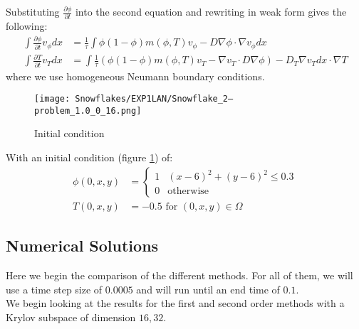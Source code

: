 Substituting $\frac{\partial \phi}{\partial t}$ into the second equation and rewriting in weak form gives the following:
\begin{align*}
    \int \frac{\partial \phi}{\partial t} v_{\phi}dx &=  \frac 1{\tau}\int \phi(1-\phi)m(\phi,T)v_{\phi} - D \nabla \phi \cdot \nabla v_{\phi}dx\\
    \int \frac{\partial T}{\partial t} v_T dx &= \int \frac 1{\tau}(\phi(1-\phi)m(\phi,T)v_T - \nabla v_T \cdot D \nabla \phi) - D_T \nabla v_Tdx \cdot \nabla T
\end{align*}
where we use homogeneous Neumann boundary conditions.
\begin{figure}[H]
    \centering
    \texttt{[image: Snowflakes/EXP1LAN/Snowflake\_2--problem\_1.0\_0\_16.png]} %
    \caption{Initial condition}
    \label{fig:initial}
\end{figure}
With an initial condition (figure \ref{fig:initial}) of: 
\begin{align*}
    \phi(0,x,y) &= \begin{cases} 
      1 & (x - 6)^2 + (y - 6)^2 \leq 0.3 \\
      0 & \text{otherwise} \end{cases}\\
    T(0,x,y) &= -0.5 \text{  for  } (0,x,y)\in \Omega
\end{align*}

\subsection{Numerical Solutions}
Here we begin the comparison of the different methods.
For all of them, we will use a time step size of $0.0005$ and will run until an end time of $0.1$.\\

We begin looking at the results for the first and second order methods with a Krylov subspace of dimension $16, 32$.

